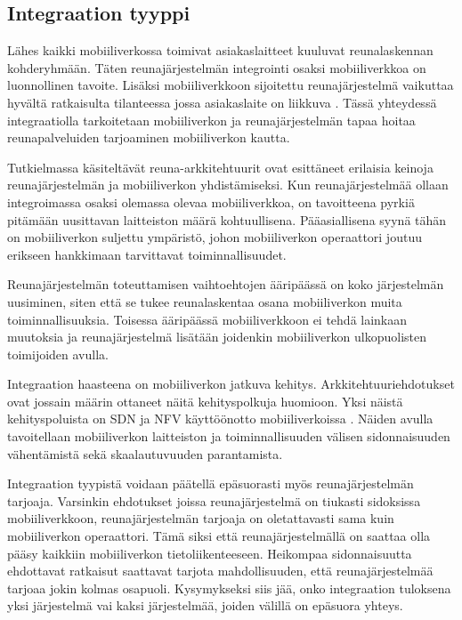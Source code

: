 
\subsection{Integraation tyyppi} \label{integraatio}
Lähes kaikki mobiiliverkossa toimivat asiakaslaitteet kuuluvat reunalaskennan kohderyhmään.
Täten reunajärjestelmän integrointi osaksi mobiiliverkkoa on luonnollinen tavoite.
Lisäksi mobiiliverkkoon sijoitettu reunajärjestelmä vaikuttaa hyvältä ratkaisulta tilanteessa jossa asiakaslaite on liikkuva \cite{gusev2018going}.
Tässä yhteydessä integraatiolla tarkoitetaan mobiiliverkon ja reunajärjestelmän tapaa hoitaa reunapalveluiden tarjoaminen mobiiliverkon kautta.

Tutkielmassa käsiteltävät reuna-arkkitehtuurit ovat esittäneet erilaisia keinoja reunajärjestelmän ja mobiiliverkon yhdistämiseksi.
Kun reunajärjestelmää ollaan integroimassa osaksi olemassa olevaa mobiiliverkkoa, on tavoitteena pyrkiä pitämään uusittavan laitteiston määrä kohtuullisena. Pääasiallisena syynä tähän on mobiiliverkon suljettu ympäristö, johon mobiiliverkon operaattori joutuu erikseen hankkimaan tarvittavat toiminnallisuudet.

Reunajärjestelmän toteuttamisen vaihtoehtojen ääripäässä on koko järjestelmän uusiminen, siten että se tukee reunalaskentaa osana mobiiliverkon muita toiminnallisuuksia.
Toisessa ääripäässä mobiiliverkkoon ei tehdä lainkaan muutoksia ja reunajärjestelmä lisätään joidenkin mobiiliverkon ulkopuolisten toimijoiden avulla. 

Integraation haasteena on mobiiliverkon jatkuva kehitys. Arkkitehtuuriehdotukset ovat jossain määrin ottaneet näitä kehityspolkuja huomioon. 
Yksi näistä kehityspoluista on SDN ja NFV käyttöönotto mobiiliverkoissa \cite{heinonen2014dynamic, nfvwhite}. 
Näiden avulla tavoitellaan mobiiliverkon laitteiston ja toiminnallisuuden välisen sidonnaisuuden vähentämistä sekä skaalautuvuuden parantamista.

Integraation tyypistä voidaan päätellä epäsuorasti myös reunajärjestelmän tarjoaja.
Varsinkin ehdotukset joissa reunajärjestelmä on tiukasti sidoksissa mobiiliverkkoon, reunajärjestelmän tarjoaja on oletattavasti sama kuin mobiiliverkon operaattori.
Tämä siksi että reunajärjestelmällä on saattaa olla pääsy kaikkiin mobiiliverkon tietoliikenteeseen.
Heikompaa sidonnaisuutta ehdottavat ratkaisut saattavat tarjota mahdollisuuden, että reunajärjestelmää tarjoaa jokin kolmas osapuoli. Kysymykseksi siis jää, onko integraation tuloksena yksi järjestelmä vai kaksi järjestelmää, joiden välillä on epäsuora yhteys.

